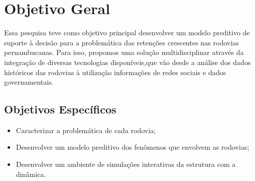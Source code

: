 \pagebreak

\section{ Objetivo Geral}\label{intro:objetivo}

Essa pesquisa teve como objetivo principal desenvolver um modelo preditivo de suporte à decisão para a problemática das retenções crescentes nas rodovias pernambucanas. 
Para isso, propomos uma solução multidisciplinar através da integração de diversas tecnologias disponíveis,que vão desde a análise dos dados históricos das 
rodovias à utilização informações de redes sociais e dados governamentais.

\subsection{ Objetivos Específicos}\label{intro:especificos}

\begin{itemize}
 \item Caracterizar a problemática de cada rodovia; 
 \item Desenvolver um modelo preditivo dos fenômenos que envolvem as rodovias;
 \item Desenvolver um ambiente de simulações interativas da estrutura com a dinâmica.
\end{itemize}










